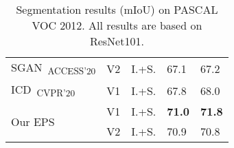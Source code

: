 \begin{table}[]
{\begin{tabular}{@{}lccll@{}}
\multicolumn{1}{l}{SGAN~\cite{yao2020saliency}\textsubscript{ACCESS'20}}                & V2        & I.+S. & 67.1                    & 67.2                     \\
\multicolumn{1}{l}{ICD~\cite{fan2020learning}\textsubscript{CVPR'20}}                   & V1        & I.+S. & 67.8                    & 68.0                     \\ \midrule
\multicolumn{1}{l}{\multirow{2}{*}{Our EPS}}                                            & V1        & I.+S. & \textbf{71.0}           & \textbf{71.8}            \\
\multicolumn{1}{l}{}                                                                    & V2        & I.+S. & 70.9                    & 70.8                     \\ \bottomrule
\end{tabular}
}
\vspace{2mm}
\caption{Segmentation results (mIoU) on PASCAL VOC 2012. All results are based on ResNet101.}\vspace{-2mm}
\label{tab:seg_quan_voc_resnet101}
\end{table}